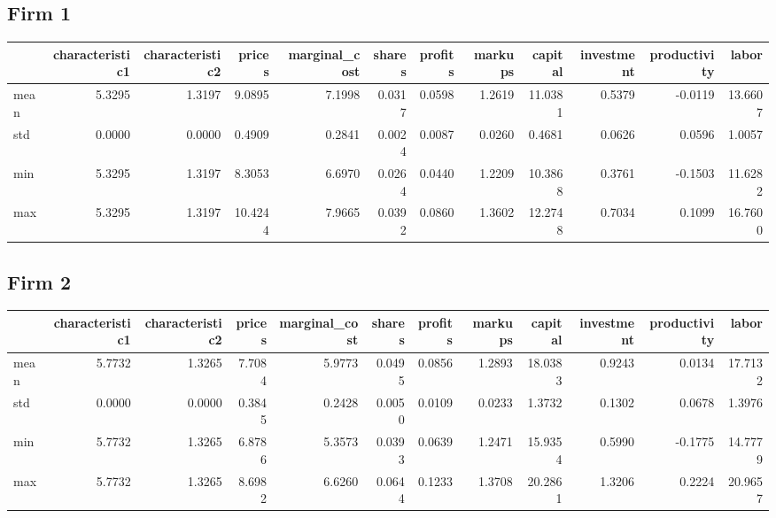 \subsection*{Firm 1}
\begin{tabular}{lrrrrrrrrrrr}
\toprule
{} &  characteristic1 &  characteristic2 &  prices &  marginal\_cost &  shares &  profits &  markups &  capital &  investment &  productivity &   labor \\
\midrule
mean &           5.3295 &           1.3197 &  9.0895 &         7.1998 &  0.0317 &   0.0598 &   1.2619 &  11.0381 &      0.5379 &       -0.0119 & 13.6607 \\
std  &           0.0000 &           0.0000 &  0.4909 &         0.2841 &  0.0024 &   0.0087 &   0.0260 &   0.4681 &      0.0626 &        0.0596 &  1.0057 \\
min  &           5.3295 &           1.3197 &  8.3053 &         6.6970 &  0.0264 &   0.0440 &   1.2209 &  10.3868 &      0.3761 &       -0.1503 & 11.6282 \\
max  &           5.3295 &           1.3197 & 10.4244 &         7.9665 &  0.0392 &   0.0860 &   1.3602 &  12.2748 &      0.7034 &        0.1099 & 16.7600 \\
\bottomrule
\end{tabular}


\subsection*{Firm 2}
\begin{tabular}{lrrrrrrrrrrr}
\toprule
{} &  characteristic1 &  characteristic2 &  prices &  marginal\_cost &  shares &  profits &  markups &  capital &  investment &  productivity &   labor \\
\midrule
mean &           5.7732 &           1.3265 &  7.7084 &         5.9773 &  0.0495 &   0.0856 &   1.2893 &  18.0383 &      0.9243 &        0.0134 & 17.7132 \\
std  &           0.0000 &           0.0000 &  0.3845 &         0.2428 &  0.0050 &   0.0109 &   0.0233 &   1.3732 &      0.1302 &        0.0678 &  1.3976 \\
min  &           5.7732 &           1.3265 &  6.8786 &         5.3573 &  0.0393 &   0.0639 &   1.2471 &  15.9354 &      0.5990 &       -0.1775 & 14.7779 \\
max  &           5.7732 &           1.3265 &  8.6982 &         6.6260 &  0.0644 &   0.1233 &   1.3708 &  20.2861 &      1.3206 &        0.2224 & 20.9657 \\
\bottomrule
\end{tabular}


